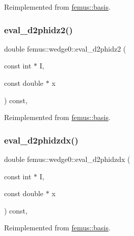 Reimplemented from \mbox{\hyperlink{classfemus_1_1basis_ab9e060e9c9e763d8c10fdffcc5e0b774}{femus\+::basis}}.

\mbox{\label{classfemus_1_1wedge0_abdda569dd9042829c15483e9c2000be4}} 
\subsubsection{\texorpdfstring{eval\+\_\+d2phidz2()}{eval\_d2phidz2()}}
{\footnotesize\ttfamily double femus\+::wedge0\+::eval\+\_\+d2phidz2 (\begin{DoxyParamCaption}\item[{const int $\ast$}]{I,  }\item[{const double $\ast$}]{x }\end{DoxyParamCaption}) const\hspace{0.3cm}{\ttfamily [inline]}, {\ttfamily [virtual]}}



Reimplemented from \mbox{\hyperlink{classfemus_1_1basis_a9d32da05f49ba2c989fec04fb7836c39}{femus\+::basis}}.

\mbox{\label{classfemus_1_1wedge0_a7ca29b396daf72718fc2a700b52410f0}} 
\subsubsection{\texorpdfstring{eval\+\_\+d2phidzdx()}{eval\_d2phidzdx()}}
{\footnotesize\ttfamily double femus\+::wedge0\+::eval\+\_\+d2phidzdx (\begin{DoxyParamCaption}\item[{const int $\ast$}]{I,  }\item[{const double $\ast$}]{x }\end{DoxyParamCaption}) const\hspace{0.3cm}{\ttfamily [inline]}, {\ttfamily [virtual]}}



Reimplemented from \mbox{\hyperlink{classfemus_1_1basis_a5d619ec5bd57b7d2dc34a99d69975c77}{femus\+::basis}}.

\mbox{\label{classfemus_1_1wedge0_aa56d06d2f457dc2d60c89343fadac77b}} 
